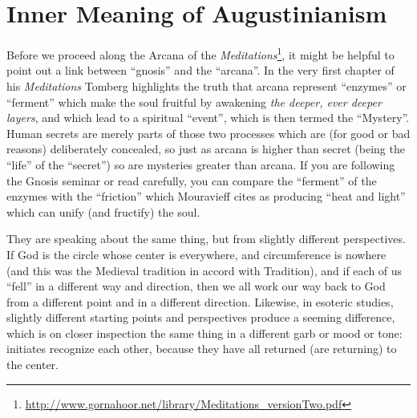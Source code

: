 \section{Inner Meaning of Augustinianism}

Before we proceed along the Arcana of the \emph{Meditations}\footnote{\url{http://www.gornahoor.net/library/Meditations\_versionTwo.pdf}}, it might be helpful to point out a link between ``gnosis'' and the ``arcana''. In the very first chapter of his \emph{Meditations} Tomberg highlights the truth that arcana represent ``enzymes'' or ``ferment'' which make the soul fruitful by awakening \emph{the deeper, ever deeper layers}, and which lead to a spiritual ``event'', which is then termed the ``Mystery''. Human secrets are merely parts of those two processes which are (for good or bad reasons) deliberately concealed, so just as arcana is higher than secret (being the ``life'' of the ``secret'') so are mysteries greater than arcana. If you are following the Gnosis seminar or read carefully, you can compare the ``ferment'' of the enzymes with the ``friction'' which Mouravieff cites as producing ``heat and light'' which can unify (and fructify) the soul.

They are speaking about the same thing, but from slightly different perspectives. If God is the circle whose center is everywhere, and circumference is nowhere (and this was the Medieval tradition in accord with Tradition), and if each of us ``fell'' in a different way and direction, then we all work our way back to God from a different point and in a different direction. Likewise, in esoteric studies, slightly different starting points and perspectives produce a seeming difference, which is on closer inspection the same thing in a different garb or mood or tone: initiates recognize each other, because they have all returned (are returning) to the center.

